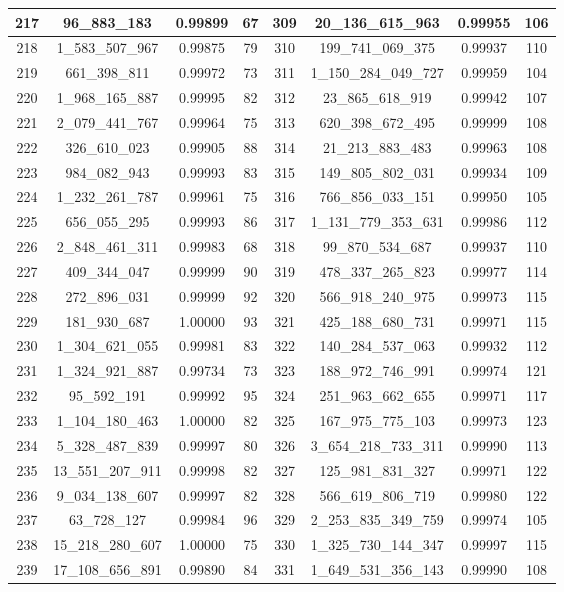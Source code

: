 \documentclass[letterpaper]{article}
\begin{document}
{\begin{tabular}{|c c c c| c c c c|}
\hline
217 & 96\_883\_183 & 0.99899 & 67 & 309 & 20\_136\_615\_963 & 0.99955 & 106 \\ 
\hline
218 & 1\_583\_507\_967 & 0.99875 & 79 & 310 & 199\_741\_069\_375 & 0.99937 & 110 \\ 
\hline
219 & 661\_398\_811 & 0.99972 & 73 & 311 & 1\_150\_284\_049\_727 & 0.99959 & 104 \\ 
\hline
220 & 1\_968\_165\_887 & 0.99995 & 82 & 312 & 23\_865\_618\_919 & 0.99942 & 107 \\ 
\hline
221 & 2\_079\_441\_767 & 0.99964 & 75 & 313 & 620\_398\_672\_495 & 0.99999 & 108 \\ 
\hline
222 & 326\_610\_023 & 0.99905 & 88 & 314 & 21\_213\_883\_483 & 0.99963 & 108 \\ 
\hline
223 & 984\_082\_943 & 0.99993 & 83 & 315 & 149\_805\_802\_031 & 0.99934 & 109 \\ 
\hline
224 & 1\_232\_261\_787 & 0.99961 & 75 & 316 & 766\_856\_033\_151 & 0.99950 & 105 \\ 
\hline
225 & 656\_055\_295 & 0.99993 & 86 & 317 & 1\_131\_779\_353\_631 & 0.99986 & 112 \\ 
\hline
226 & 2\_848\_461\_311 & 0.99983 & 68 & 318 & 99\_870\_534\_687 & 0.99937 & 110 \\ 
\hline
227 & 409\_344\_047 & 0.99999 & 90 & 319 & 478\_337\_265\_823 & 0.99977 & 114 \\ 
\hline
228 & 272\_896\_031 & 0.99999 & 92 & 320 & 566\_918\_240\_975 & 0.99973 & 115 \\ 
\hline
229 & 181\_930\_687 & 1.00000 & 93 & 321 & 425\_188\_680\_731 & 0.99971 & 115 \\ 
\hline
230 & 1\_304\_621\_055 & 0.99981 & 83 & 322 & 140\_284\_537\_063 & 0.99932 & 112 \\ 
\hline
231 & 1\_324\_921\_887 & 0.99734 & 73 & 323 & 188\_972\_746\_991 & 0.99974 & 121 \\ 
\hline
232 & 95\_592\_191 & 0.99992 & 95 & 324 & 251\_963\_662\_655 & 0.99971 & 117 \\ 
\hline
233 & 1\_104\_180\_463 & 1.00000 & 82 & 325 & 167\_975\_775\_103 & 0.99973 & 123 \\ 
\hline
234 & 5\_328\_487\_839 & 0.99997 & 80 & 326 & 3\_654\_218\_733\_311 & 0.99990 & 113 \\ 
\hline
235 & 13\_551\_207\_911 & 0.99998 & 82 & 327 & 125\_981\_831\_327 & 0.99971 & 122 \\ 
\hline
236 & 9\_034\_138\_607 & 0.99997 & 82 & 328 & 566\_619\_806\_719 & 0.99980 & 122 \\ 
\hline
237 & 63\_728\_127 & 0.99984 & 96 & 329 & 2\_253\_835\_349\_759 & 0.99974 & 105 \\ 
\hline
238 & 15\_218\_280\_607 & 1.00000 & 75 & 330 & 1\_325\_730\_144\_347 & 0.99997 & 115 \\ 
\hline
239 & 17\_108\_656\_891 & 0.99890 & 84 & 331 & 1\_649\_531\_356\_143 & 0.99990 & 108 \\ 
\hline
\end{tabular}
}
\end{document}
